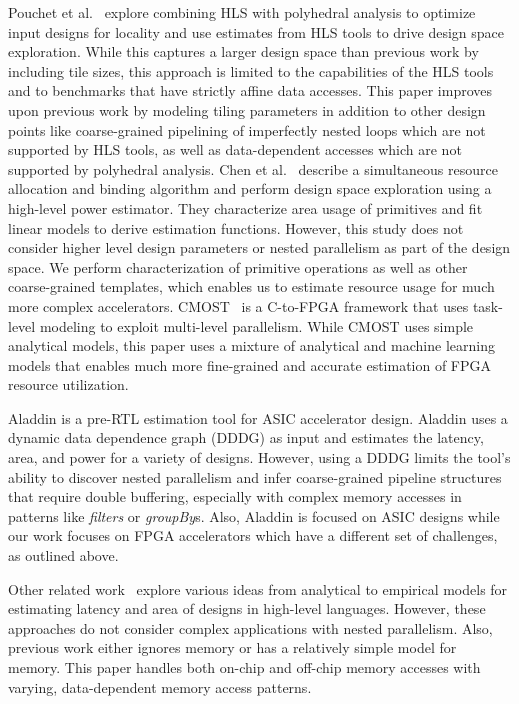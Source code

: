 Pouchet et al.~\cite{pouchet13fpga}
explore combining HLS with polyhedral analysis to optimize input designs for locality
and use estimates from HLS tools to drive design space exploration. While this captures a larger design
space than previous work by including tile sizes, this approach is limited to the capabilities
of the HLS tools and to benchmarks that have strictly affine data accesses. This paper improves
upon previous work by modeling tiling
parameters in addition to other design points like coarse-grained pipelining of imperfectly nested loops
which are not supported by HLS tools, as well as data-dependent accesses which are not supported by polyhedral analysis.
Chen et al.~\cite{cong_powerdse} describe a simultaneous resource allocation and binding algorithm
and perform design space exploration using a high-level power estimator. They characterize area
usage of primitives and fit linear models to derive estimation
functions. However, this study does not consider higher level design parameters or nested
parallelism as part of the design space. We perform characterization of primitive
operations as well as other coarse-grained templates, which enables us to estimate resource usage for
much more complex accelerators.
CMOST~\cite{cong_cmost} is a C-to-FPGA framework that uses task-level modeling
to exploit multi-level parallelism. While CMOST uses simple analytical models, this paper uses a mixture of
analytical and machine learning models that enables much more fine-grained and accurate estimation of FPGA resource utilization.

Aladdin\cite{Aladdin} is a pre-RTL estimation tool for ASIC accelerator design.
Aladdin uses a dynamic data dependence graph (DDDG) as input and estimates the latency, area, and power
for a variety of designs. However, using a DDDG limits the tool's ability to discover nested parallelism
and infer coarse-grained pipeline structures that require double buffering, especially with complex
memory accesses in patterns like \emph{filters} or \emph{groupBy}s. Also, Aladdin is focused on ASIC designs
while our work focuses on FPGA accelerators which have a different set of challenges, as outlined above.

Other related work~\cite{Deng,Bilavarn,MatchEst,Enzler,Bjureus} explore various ideas from analytical to empirical
models for estimating latency and area of designs in high-level languages. However, these approaches do not
consider complex applications with nested parallelism. Also, previous work either ignores memory or has a relatively
simple model for memory. This paper handles both on-chip and off-chip memory accesses
with varying, data-dependent memory access patterns.


